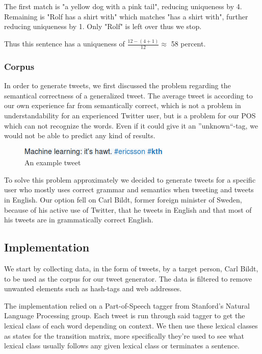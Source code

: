 \documentclass[a4paper,12pt]{article}
\begin{document}
The first match is "a yellow dog with a pink tail", reducing uniqueness by 4. Remaining is "Rolf has a shirt with" which matches "has a shirt with", further reducing uniqueness by 1. Only "Rolf" is left over thus we stop. 

Thus this sentence has a uniqueness of $\frac{12 - (4 + 1)}{12} \approx$ 58 percent.

\subsubsection{Corpus}
In order to generate tweets, we first discussed the problem regarding the semantical correctness of a generalized tweet.
The average tweet is according to our own experience far from semantically correct, which is not a problem in understandability for an experienced Twitter user,
but is a problem for our POS which can not recognize the words. Even if it could give it an ''unknown``-tag, we would not be able to predict any kind of results.

\begin{figure}[h!]
  \centering
  \includegraphics[width=0.6\linewidth]{machine_learning}
  \caption{An example tweet}
\end{figure}

To solve this problem approximately we decided to generate tweets for a specific user who mostly uses correct grammar and semantics when tweeting and tweets in English.
Our option fell on Carl Bildt, former foreign minister of Sweden, because of his active use of Twitter, 
that he tweets in English and that most of his tweets are in grammatically correct English.

\subsection{Implementation}
\label{sec:impl}
We start by collecting data, in the form of tweets, by a target person, Carl Bildt, to be used as the corpus for our tweet generator. The data is filtered to remove unwanted elements such as hash-tags and web addresses.

The implementation relied on a Part-of-Speech tagger from Stanford's Natural Language Processing group. Each tweet is run through said tagger to get the lexical class of each word depending on context.
We then use these lexical classes as states for the transition matrix, more specifically they're used to see what lexical class usually follows any given lexical class or terminates a sentence.
\end{document}
